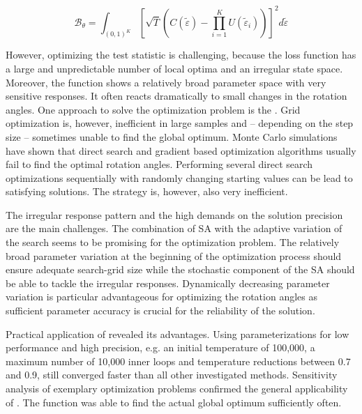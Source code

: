 \begin{equation}\label{eq: cvm}
\mathcal{B}_\theta = \int_{(0,1)^K}\left[\sqrt{T}\left(C(\tilde{\varepsilon}) - \prod^K_{i = 1}U(\tilde{\varepsilon}_i)\right)\right]^2d\tilde{\varepsilon}
\end{equation}


However, optimizing the test statistic is challenging, because the loss function has a large and unpredictable number of local optima and an irregular state space. Moreover, the function shows a relatively broad parameter space with very sensitive responses. It often reacts dramatically to small changes in the rotation angles. One approach to solve the optimization problem is the  \citep{herwartz_2015}. Grid optimization is, however, inefficient in large samples and -- depending on the step size -- sometimes unable to find the global optimum. Monte Carlo simulations have shown that direct search and gradient based optimization algorithms usually fail to find the optimal rotation angles. Performing several direct search optimizations sequentially with randomly changing starting values can be lead to satisfying solutions. The strategy is, however, also very inefficient.

The irregular response pattern and the high demands on the solution precision are the main challenges. The combination of SA with the adaptive variation of the search seems to be promising for the optimization problem. The relatively broad parameter variation at the beginning of the optimization process should ensure adequate search-grid size while the stochastic component of the SA should be able to tackle the irregular responses. Dynamically decreasing parameter variation is particular advantageous for optimizing the rotation angles as sufficient parameter accuracy is crucial for the reliability of the solution.

Practical application of  revealed its advantages. Using parameterizations for low performance and high precision, e.g. an initial temperature of 100,000, a maximum number of 10,000 inner loops and temperature reductions between 0.7 and 0.9, still converged faster than all other investigated methods. Sensitivity analysis of exemplary optimization problems confirmed the general applicability of . The function was able to find the actual global optimum sufficiently often.

